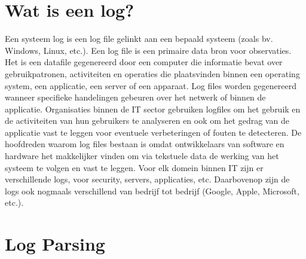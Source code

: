 \section{Wat is een log?}

Een systeem log is een log file gelinkt aan een bepaald systeem (zoals bv. Windows, Linux, etc.). Een log file is een primaire data bron voor observaties. Het is een datafile gegenereerd door een computer die informatie bevat over gebruikpatronen, activiteiten en operaties die plaatsvinden binnen een operating system, een applicatie, een server of een apparaat. Log files worden gegenereerd wanneer specifieke handelingen gebeuren over het netwerk of binnen de applicatie. Organisaties binnen de IT sector gebruiken logfiles om het gebruik en de activiteiten van hun gebruikers te analyseren en ook om het gedrag van de applicatie vast te leggen voor eventuele verbeteringen of fouten te detecteren. De hoofdreden waarom log files bestaan is omdat ontwikkelaars van software en hardware het makkelijker vinden om via tekstuele data de werking van het systeem te volgen en vast te leggen. Voor elk domein binnen IT zijn er verschillende logs, voor security, servers, applicaties, etc. Daarbovenop zijn de logs ook nogmaals verschillend van bedrijf tot bedrijf (Google, Apple, Microsoft, etc.).

\section{Log Parsing}

